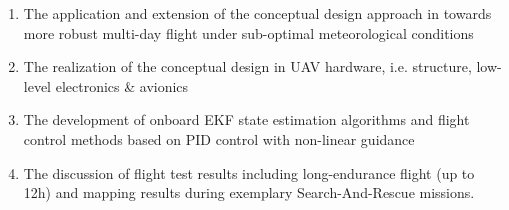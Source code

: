  \begin{enumerate}
\item The application and extension of the conceptual design approach in \cite{Noth_PhD,Leutenegger_JIRS} towards more robust multi-day flight under sub-optimal meteorological conditions
\item The realization of the conceptual design in UAV hardware, i.e. structure, low-level electronics \& avionics 
\item The development of onboard EKF state estimation algorithms and flight control methods based on PID control with non-linear guidance
\item The discussion of flight test results including long-endurance flight (up to 12h) and mapping results during exemplary Search-And-Rescue missions.
\end{enumerate}

